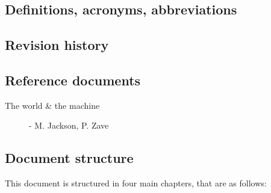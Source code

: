 \documentclass[../main.tex]{subfiles}
\begin{document}
%
%
%
%
%

\subsection{Definitions, acronyms, abbreviations}
\subsection{Revision history}
\subsection{Reference documents}

\begin{description}
	\item [The world \& the machine] - M. Jackson, P. Zave
\end{description}

\subsection{Document structure}

This document is structured in four main chapters, that are as follows:
\end{document}
